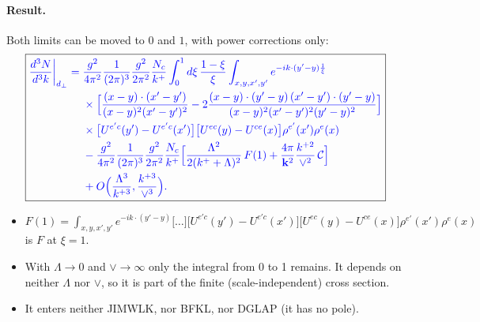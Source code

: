 \documentclass[10pt]{article}
\numberwithin{equation}{section}
\newcommand{\CC}{\mathcal C}
\newcommand{\new}[1]{{\color{blue}#1}}
\newcommand{\pre}{\frac{g^{2}}{4\pi^{2}}\frac{1}{(2\pi)^{3}}\frac{g^{2}}{2\pi^{2}}\frac{N_{c}}{k^{+}}}
\newcommand{\XX}{\frac{(x-y)\cdot(x'-y')}{(x-y)^{2}(x'-y')^{2}}}
\newcommand{\XD}{\frac{(x-y)\cdot(y'-y)\,(x'-y')\cdot(y'-y)}{(x-y)^{2}(x'-y')^{2}(y'-y)^{2}}}
\newcommand{\ph}{e^{-ik\cdot(y'-y)\frac{1}{\xi}}}
\newcommand{\Ucol}{\big[U^{e'c}(y')-U^{e'c}(x')\big]\big[U^{ec}(y)-U^{ce}(x)\big]\rho^{e'}(x')\rho^{e}(x)}
\begin{document}
\paragraph{Result.} Both limits can be moved to $0$ and $1$, with power corrections only:
\begin{equation}
\boxed{\new{\begin{aligned}\frac{d^3N}{d^3k}\bigg|_{d_\perp}={}&\pre\int_{0}^{1}d\xi\,\frac{1-\xi}{\xi}\int_{x,y,x',y'}\ph\\
&\times\Big[\XX-2\XD\Big]\\
&\times\Ucol\\
&-\pre\Big[\frac{\Lambda^2}{2(k^++\Lambda)^2}\,F(1)+\frac{4\pi}{\mathbf k^2}\frac{k^{+2}}{\vee^2}\,\CC\Big]\\
&+O\Big(\frac{\Lambda^3}{k^{+3}},\frac{k^{+3}}{\vee^3}\Big).\end{aligned}}}
\label{eq:result}
\end{equation}
\begin{itemize}
\item $F(1)=\int_{x,y,x',y'}e^{-ik\cdot(y'-y)}\big[\dots\big]\Ucol$ is $F$ at $\xi=1$.
\item With $\Lambda\to0$ and $\vee\to\infty$ only the integral from 0 to 1 remains. It depends on neither $\Lambda$ nor $\vee$, so it is part of the finite (scale-independent) cross section.
\item It enters neither JIMWLK, nor BFKL, nor DGLAP (it has no pole).
\end{itemize}

\end{document}
